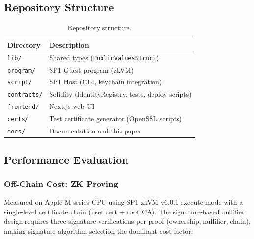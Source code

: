 \documentclass[11pt, a4paper]{article}
\begin{document}
\subsection{Repository Structure}\label{repository-structure}

\begin{table}[ht]
\centering
\small
\caption{Repository structure.}
\label{tab:repo-structure}
\begin{tabular}{@{}ll@{}}
\toprule
Directory & Description \\
\midrule
\texttt{lib/} & Shared types (\texttt{PublicValuesStruct}) \\
\texttt{program/} & SP1 Guest program (zkVM) \\
\texttt{script/} & SP1 Host (CLI, keychain integration) \\
\texttt{contracts/} & Solidity (IdentityRegistry, tests, deploy scripts) \\
\texttt{frontend/} & Next.js web UI \\
\texttt{certs/} & Test certificate generator (OpenSSL scripts) \\
\texttt{docs/} & Documentation and this paper \\
\bottomrule
\end{tabular}
\end{table}

\subsection{Performance Evaluation}\label{performance-evaluation}

\subsubsection{Off-Chain Cost: ZK
Proving}\label{off-chain-cost-zk-proving}

Measured on Apple M-series CPU using SP1 zkVM v6.0.1 execute mode with a
single-level certificate chain (user cert + root CA). The
signature-based nullifier design requires three signature verifications
per proof (ownership, nullifier, chain), making signature algorithm
selection the dominant cost factor:
\end{document}
